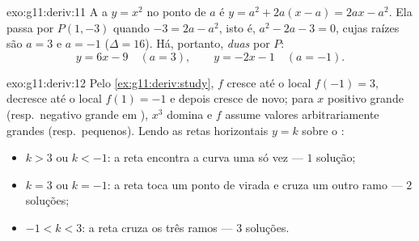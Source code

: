 \begin{solution}{exo:g11:deriv:11}
A  a $y = x^2$ no ponto de  $a$ é
$y = a^2 + 2a(x - a) = 2ax - a^2$. Ela passa por $P(1, -3)$ quando
$-3 = 2a - a^2$, isto é, $a^2 - 2a - 3 = 0$, cujas raízes são $a = 3$ e
$a = -1$ ($\Delta = 16$). Há, portanto, \emph{duas}  por $P$:
\[
y = 6x - 9 \quad (a = 3),
\qquad
y = -2x - 1 \quad (a = -1).
\]
\end{solution}

\begin{solution}{exo:g11:deriv:12}
Pelo \cref{ex:g11:deriv:study}, $f$ cresce até o  local
$f(-1) = 3$, decresce até o  local $f(1) = -1$ e depois cresce de
novo; para $x$ positivo grande (resp.\ negativo grande em ), $x^3$
domina e $f$ assume valores arbitrariamente grandes (resp.\ pequenos).
Lendo as retas horizontais $y = k$ sobre o :
\begin{itemize}
  \item $k > 3$ ou $k < -1$: a reta encontra a curva uma só vez ---
        $1$ solução;
  \item $k = 3$ ou $k = -1$: a reta toca um ponto de virada e cruza um
        outro ramo --- $2$ soluções;
  \item $-1 < k < 3$: a reta cruza os três ramos --- $3$ soluções.
\end{itemize}
\end{solution}

